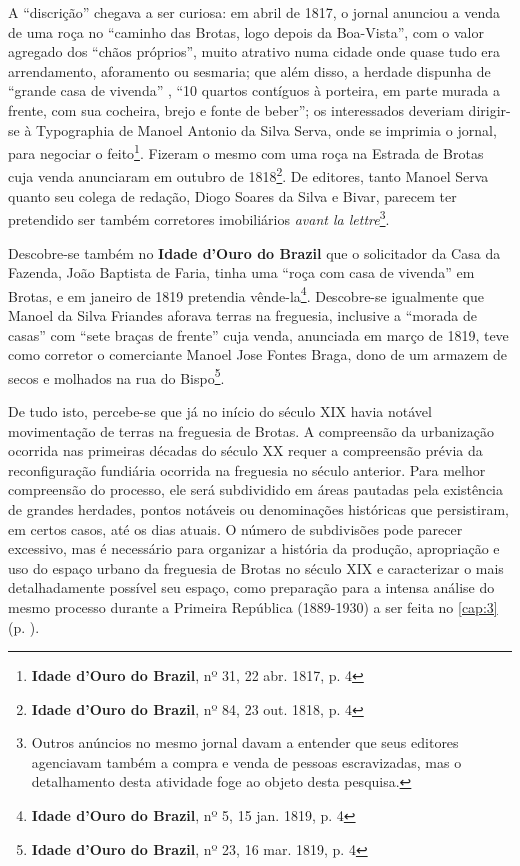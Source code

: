 A ``discrição'' chegava a ser curiosa: em abril de 1817, o jornal anunciou a venda de uma roça no ``caminho das Brotas, logo depois da Boa-Vista'', com o valor agregado dos ``chãos próprios'', muito atrativo numa cidade onde quase tudo era arrendamento, aforamento ou sesmaria; que além disso, a herdade dispunha de ``grande casa de vivenda'' , ``10 quartos contíguos à porteira, em parte murada a frente, com sua cocheira, brejo e fonte de beber''; os interessados deveriam dirigir-se à Typographia de Manoel Antonio da Silva Serva, onde se imprimia o jornal, para negociar o feito\footnote{\textbf{Idade d'Ouro do Brazil}, nº 31, 22 abr. 1817, p. 4}. Fizeram o mesmo com uma roça na Estrada de Brotas cuja venda anunciaram em outubro de 1818\footnote{\textbf{Idade d'Ouro do Brazil}, nº 84, 23 out. 1818, p. 4}. De editores, tanto Manoel Serva quanto seu colega de redação, Diogo Soares da Silva e Bivar, parecem ter pretendido ser também corretores imobiliários \textit{avant la lettre}\footnote{Outros anúncios no mesmo jornal davam a entender que seus editores agenciavam também a compra e venda de pessoas escravizadas, mas o detalhamento desta atividade foge ao objeto desta pesquisa.}.

Descobre-se também no \textbf{Idade d'Ouro do Brazil} que o solicitador da Casa da Fazenda, João Baptista de Faria, tinha uma ``roça com casa de vivenda'' em Brotas, e em janeiro de 1819 pretendia vênde-la\footnote{\textbf{Idade d'Ouro do Brazil}, nº 5, 15 jan. 1819, p. 4}. Descobre-se igualmente que Manoel da Silva Friandes aforava terras na freguesia, inclusive a ``morada de casas'' com ``sete braças de frente'' cuja venda, anunciada em março de 1819, teve como corretor o comerciante Manoel Jose Fontes Braga, dono de um armazem de secos e molhados na rua do Bispo\footnote{\textbf{Idade d'Ouro do Brazil}, nº 23, 16 mar. 1819, p. 4}.

De tudo isto, percebe-se que já no início do século XIX havia notável movimentação de terras na freguesia de Brotas. A compreensão da urbanização ocorrida nas primeiras décadas do século XX requer a compreensão prévia da reconfiguração fundiária ocorrida na freguesia no século anterior. Para melhor compreensão do processo, ele será subdividido em áreas pautadas pela existência de grandes herdades, pontos notáveis ou denominações históricas que persistiram, em certos casos, até os dias atuais. O número de subdivisões pode parecer excessivo, mas é necessário para organizar a história da produção, apropriação e uso do espaço urbano da freguesia de Brotas no século XIX e caracterizar o mais detalhadamente possível seu espaço, como preparação para a intensa análise do mesmo processo durante a Primeira República (1889-1930) a ser feita no \autoref{cap:3} (p. \pageref{cap:3}).

